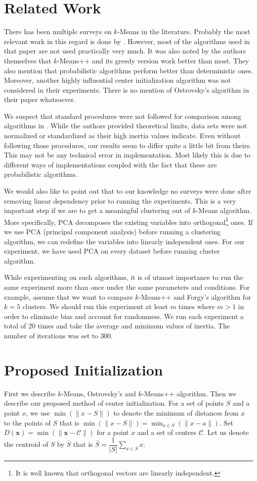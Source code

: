 \documentclass[twoside, 11pt]{article}
\newcommand{\x}{\mathbf{x}}
\newcommand{\C}{\mathcal{C}}
\begin{document}
	\section{Related Work}
	There has been multiple surveys on $k$-Means in the literature. Probably the most relevant work in this regard is done by \cite{celebi}. However, most of the algorithms used in that paper are not used practically very much. It was also noted by the authors themselves that $k$-Means++ and its greedy version work better than most. They also mention that probabilistic algorithms perform better than deterministic ones. Moreover, another highly influential center initialization algorithm \cite{ostrovsky} was not considered in their experiments. There is no mention of Ostrovsky's algorithm in their paper whatsoever.
	
	We suspect that standard procedures were not followed for comparison among algorithms in \cite{kmeans++}. While the authors provided theoretical limits, data sets were not normalized or standardized as their high inertia values indicate. Even without following those procedures, our results seem to differ quite a little bit from theirs. This may not be any technical error in implementation. Most likely this is due to different ways of implementations coupled with the fact that these are probabilistic algorithms.
	
	We would also like to point out that to our knowledge no surveys were done after removing linear dependency prior to running the experiments. This is a very important step if we are to get a meaningful clustering out of $k$-Means algorithm. More specifically, PCA decomposes the existing variables into orthogonal\footnote{It is well known that orthogonal vectors are linearly independent.} ones. If we use PCA (principal component analysis) before running a clustering algorithm, we can redefine the variables into linearly independent ones. For our experiment, we have used PCA on every dataset before running cluster algorithm.
	
	While experimenting on such algorithms, it is of utmost importance to run the same experiment more than once under the same parameters and conditions. For example, assume that we want to compare $k$-Means++ and Forgy's algorithm \cite{forgy} for $k=5$ clusters. We should run this experiment at least $m$ times where $m>1$ in order to eliminate bias and account for randomness. We run each experiment a total of $20$ times and take the average and minimum values of inertia. The number of iterations was set to $300$.
	\section{Proposed Initialization}
	First we describe $k$-Means, Ostrovsky's and $k$-Means++ algorithm. Then we describe our proposed method of center initialization. For a set of points $S$ and a point $x$, we use $\min(\|x-S\|)$ to denote the minimum of distances from $x$ to the points of $S$ that is $\min(\| x-S\|)=\min_{a\in S}(\| x-a\|)$. Set $D(\x)=\min(\|\x-\C\|)$ for a point $x$ and a set of centers $\C$. Let us denote the centroid of $S$ by $\bar{S}$ that is $\bar{S}=\dfrac{1}{|S|}\sum_{x\in S}x$.
\end{document}
